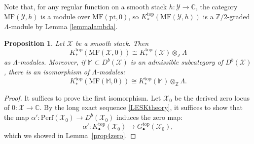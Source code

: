 \documentclass [11pt,oneside,a4paper,mathscr]{amsart}
\newtheorem{prop}[thm]{Proposition}
\theoremstyle{definition}
\newcommand{\X}{\mathscr{X}}
\begin{document}
Note that, for any regular function on a smooth stack $h\colon \mathscr{Y}\to\mathbb{C}$, the category $\mathrm{MF}(\mathscr{Y}, h)$ is a module over $\mathrm{MF}(\mathrm{pt}, 0)$, 
  so $K_{\ast}^{\mathrm{top}}(\mathrm{MF}(\mathscr{Y}, h))$
  is a $\mathbb{Z}/2$-graded 
  $\Lambda$-module by Lemma \ref{lemmalambda}. 

\begin{prop}\label{Lambdastructure}
    Let $\X$ be a smooth stack. Then \[K^{\mathrm{top}}_{\ast}(\mathrm{MF}(\X, 0))\cong K^{\mathrm{top}}_{\ast}(\X)\otimes_\mathbb{Z}\Lambda\] as $\Lambda$-modules.
    Moreover, if $\mathbb{M}\subset D^b(\X)$ is an admissible subcategory of $D^b(\X)$, there is an isomorphism of $\Lambda$-modules: \[K^{\mathrm{top}}_{\ast}(\mathrm{MF}(\mathbb{M}, 0))\cong K^{\mathrm{top}}_{\ast}(\mathbb{M})\otimes_\mathbb{Z}\Lambda.\]
\end{prop}

\begin{proof}
It suffices to prove the first isomorphism.
Let $\X_0$ be the derived zero locus of $0\colon \X\to\mathbb{C}$. 
By the long exact sequence \eqref{LESKtheory}, it suffices to show that the map $\alpha'\colon \mathrm{Perf}(\X_0)\to D^b(\X_0)$ induces the zero map:
\[\alpha'\colon K^{\mathrm{top}}_\bullet(\X_0)\to G^{\mathrm{top}}_\bullet(\X_0),\]
which we showed in Lemma~\ref{prop4zero}.
\end{proof}
\end{document}
